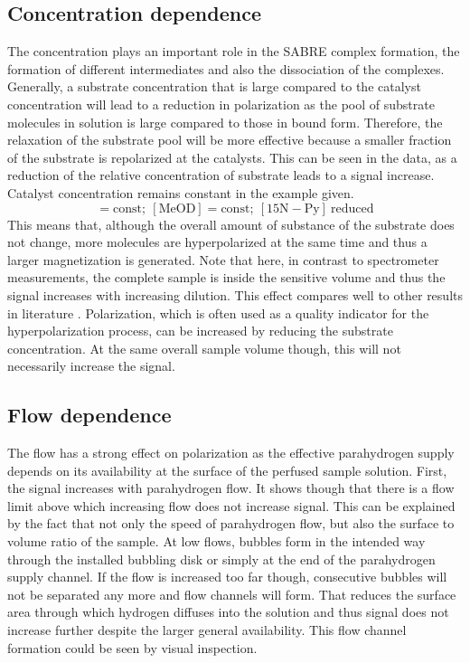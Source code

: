         \subsection{Concentration dependence}
            The concentration plays an important role in the SABRE complex formation, the formation of different intermediates and also the dissociation of the complexes. Generally, a substrate concentration that is large compared to the catalyst concentration will lead to a reduction in polarization as the pool of substrate molecules in solution is large compared to those in bound form. Therefore, the relaxation of the substrate pool will be more effective because a smaller fraction of the substrate is repolarized at the catalysts. This can be seen in the data, as a reduction of the relative concentration of substrate leads to a signal increase. Catalyst concentration remains constant in the example given.
            \begin{equation*}
                [\mathrm{IrIMes}] = \mathrm{const};~[\mathrm{MeOD}] = \mathrm{const};~[\mathrm{15N-Py}]~\mathrm{reduced}
            \end{equation*}
            This means that, although the overall amount of substance of the substrate does not change, more molecules are hyperpolarized at the same time and thus a larger magnetization is generated. Note that here, in contrast to spectrometer measurements, the complete sample is inside the sensitive volume and thus the signal increases with increasing dilution. This effect compares well to other results in literature . Polarization, which is often used as a quality indicator for the hyperpolarization process, can be increased by reducing the substrate concentration. At the same overall sample volume though, this will not necessarily increase the signal.
        \subsection{Flow dependence}
            The flow has a strong effect on polarization as the effective parahydrogen supply depends on its availability at the surface of the perfused sample solution. First, the signal increases with parahydrogen flow. It shows though that there is a flow limit above which increasing flow does not increase signal. This can be explained by the fact that not only the speed of parahydrogen flow, but also the surface to volume ratio of the sample. At low flows, bubbles form in the intended way through the installed bubbling disk or simply at the end of the parahydrogen supply channel. If the flow is increased too far though, consecutive bubbles will not be separated any more and flow channels will form. That reduces the surface area through which hydrogen diffuses into the solution and thus signal does not increase further despite the larger general availability. This flow channel formation could be seen by visual inspection.
